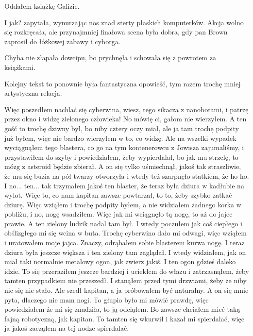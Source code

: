 Oddałem książkę Galizie.

\begin{dialogue}
	\ds{} I jak? \dm{} zapytała, wynurzając nos znad sterty płaskich komputerków.
	\ds{} Akcja wolno się rozkręcała, ale przynajmniej finałowa scena była dobra, gdy pan Brown zaprosił do łóżkowej zabawy i cyborga.
\end{dialogue}

Chyba nie złapała dowcipu, bo prychnęła i schowała się z powrotem za książkami.

Kolejny tekst to ponownie była fantastyczna opowieść, tym razem trochę mniej artystyczna relacja.

\begin{poem}
	Więc poszedłem nachlać się cyberwina, wiesz, tego sikacza z nanobotami, i patrzę przez okno i widzę zielonego człowieka!
	No mówię ci, gałom nie wierzyłem. A ten gość to trochę dziwny był, bo niby cztery oczy miał, ale ja tam trochę podpity już byłem, więc nie bardzo wierzyłem w to, co widzę.
	Ale na wszelki wypadek wyciągnąłem tego blastera, co go na tym kontenerowcu z Jowisza zajumaliśmy, i przystawiłem do szyby i powiedziałem, żeby wypierdalał, bo jak mu strzelę, to mózg z asteroid będzie zbierał.
	A on się tylko uśmiechnął, jakoś tak straszliwie, że mu się buzia na pół twarzy otworzyła i wtedy też szarpnęło statkiem, że ho ho.
	I no... ten... tak trzymałem jakoś ten blaster, że teraz była dziura w kadłubie na wylot. Więc to, co nam kapitan zawsze powtarzał, to to, żeby szybko zatkać dziurę.
	Więc wziąłem i trochę podpity byłem, a nie widziałem żadnego korka w pobliżu, i no, nogę wsadziłem.
	Więc jak mi wciągnęło tą nogę, to aż do jajec prawie. A ten zielony ludzik nadal tam był. I wtedy poczułem jak coś ciepłego i obślizgłego mi się wcina w buta.
	Trochę cyberwino dało mi odwagi, więc wziąłem i uratowałem moje jajca.
	Znaczy, odrąbałem sobie blasterem kurwa nogę. 
	I teraz dziura była jeszcze większa i ten zielony tam zaglądał.
	I wtedy widziałem, jak on miał taki normalnie metalowy ogon, jak zwierz jakiś. I ten ogon gdzieś daleko idzie.
	To się przeraziłem jeszcze bardziej i uciekłem do włazu i zatrzasnąłem, żeby tamten przypadkiem nie przeszedł.
	I stanąłem przed tymi drzwiami, żeby że niby nic się nie stało. Ale szedł kapitan, a ja próbowałem być naturalny.
	A on się mnie pyta, dlaczego nie mam nogi.
	To głupio było mi mówić prawdę, więc powiedziałem że mi się znudziła, to ją odciąłem. Bo zawsze chciałem mieć taką fajną robotyczną, jak kapitan.
	To tamten się wkurwił i kazał mi spierdalać, więc ja jakoś zacząłem na tej nodze spierdalać.

\end{poem}
